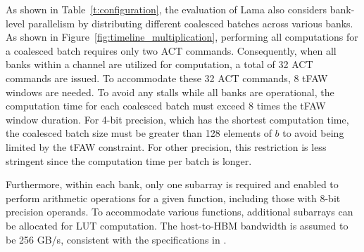 As shown in Table~\ref{t:configuration}, the evaluation of Lama also considers bank-level parallelism by distributing different coalesced batches across various banks. As shown in Figure~\ref{fig:timeline_multiplication}, performing all computations for a coalesced batch requires only two ACT commands. Consequently, when all banks within a channel are utilized for computation, a total of 32 ACT commands are issued. To accommodate these 32 ACT commands, 8 {\selectfont tFAW} windows are needed. To avoid any stalls while all banks are operational, the computation time for each coalesced batch must exceed 8 times the {\selectfont tFAW} window duration. For 4-bit precision, which has the shortest computation time, the coalesced batch size must be greater than 128 elements of $b$ to avoid being limited by the {\selectfont tFAW} constraint. For other precision, this restriction is less stringent since the computation time per batch is longer.

Furthermore, within each bank, only one subarray is required and enabled to perform arithmetic operations for a given function, including those with 8-bit precision operands. To accommodate various functions, additional subarrays can be allocated for LUT computation. The host-to-HBM bandwidth is assumed to be 256 GB/s, consistent with the specifications in \cite{fine-grained}.


